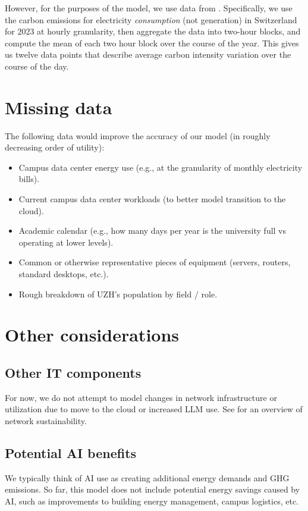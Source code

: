 \documentclass[11pt]{article}
\begin{document}
However, for the purposes of the model, we use data from \textcite{electricitymaps}. Specifically,
we use the carbon emissions for electricity {\em consumption} (not generation) in Switzerland for 2023
at hourly granularity, then aggregate the data into two-hour blocks, and compute the mean of each two
hour block over the course of the year. This gives us twelve data points that describe average
carbon intensity variation over the course of the day.

\section{Missing data}

The following data would improve the accuracy of our model (in roughly decreasing order of utility):
\begin{itemize}
    \item Campus data center energy use (e.g., at the granularity of monthly electricity bills).
    \item Current campus data center workloads (to better model transition to the cloud).
    \item Academic calendar (e.g., how many days per year is the university full vs operating
        at lower levels).
    \item Common or otherwise representative pieces of equipment (servers, routers, standard desktops, etc.).
    \item Rough breakdown of UZH's population by field / role.
\end{itemize}

\section{Other considerations}

\subsection{Other IT components}

For now, we do not attempt to model changes in network infrastructure or utilization due to
move to the cloud or increased LLM use. See \textcite{jacob2023} for an overview of
network sustainability.

\subsection{Potential AI benefits}

We typically think of AI use as creating additional energy demands and GHG emissions.
So far, this model does not include potential energy savings caused by AI, such as improvements
to building energy management, campus logistics, etc.
\end{document}
